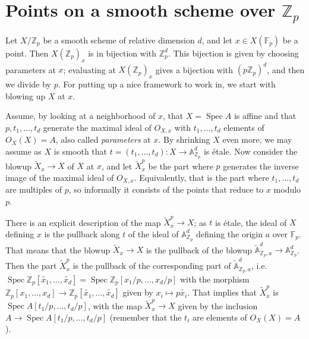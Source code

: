 \documentclass[12pt]{article}
\newcommand{\A}{\mathbb{A}}
\newcommand{\Z}{\mathbb{Z}}
\newcommand{\F}{\mathbb{F}}
\DeclareMathOperator{\Spec}{Spec}
\theoremstyle{plain}
\theoremstyle{definition}
\theoremstyle{remark}
\begin{document}
\newpage
\section{Points on a smooth scheme over \texorpdfstring{$\Z_p$}{Z\_p}}
\label{section:smoothzppoints}
Let $X/\Z_p$ be a smooth scheme of relative dimension $d$, and let $x \in X(\F_p)$ be a point. Then $X(\Z_p)_x$ is in bijection with $\Z_p^d$. This bijection is given by choosing parameters at $x$; evaluating at $X(\Z_p)_x$ gives a bijection with $(p\Z_p)^d$, and then we divide by $p$. For putting up a nice framework to work in, we start with blowing up $X$ at $x$.

Assume, by looking at a neighborhood of $x$, that $X = \Spec A$ is affine and that $p,t_1,\dots,t_d$ generate the maximal ideal of $O_{X,x}$ with $t_1,\dots,t_d$ elements of $O_X(X) = A$, also called \textit{parameters} at $x$. By shrinking $X$ even more, we may assume as $X$ is smooth that $t = (t_1,\dots,t_d): X \to \A^d_{\Z_p}$ is \'etale. Now consider the blowup $\widetilde{X}_x \to X$ of $X$ at $x$, and let $\widetilde{X}_x^p$ be the part where $p$ generates the inverse image of the maximal ideal of $O_{X,x}$. Equivalently, that is the part where $t_1,\dots,t_d$ are multiples of $p$, so informally it consists of the points that reduce to $x$ modulo $p$.

There is an explicit description of the map $\widetilde{X}_x^p \to X$; as $t$ is \'etale, the ideal of $X$ defining $x$ is the pullback along $t$ of the ideal of $\A^d_{\Z_p}$ defining the origin $a$ over $\F_p$. That means that the blowup $\widetilde{X}_x \to X$ is the pullback of the blowup $\widetilde{\A}^d_{\Z_p,a} \to \A_{\Z_p}^d$. Then the part $\widetilde{X}_x^p$ is the pullback of the corresponding part of $\widetilde{\A}^d_{\Z_p,a}$, i.e. $\Spec \Z_p[\widetilde{x_1},\dots,\widetilde{x_d}] = \Spec \Z_p[x_1/p,\dots,x_d/p]$ with the morphism $\Z_p[x_1,\dots,x_d] \to \Z_p[\widetilde{x_1},\dots,\widetilde{x_d}]$ given by $x_i \mapsto p\widetilde{x_i}$. That implies that $\widetilde{X}_x^p$ is $\Spec A[t_1/p,\dots,t_d/p]$, with the map $\widetilde{X}_x^p \to X$ given by the inclusion $A \to \Spec A[t_1/p,\dots,t_d/p]$ (remember that the $t_i$ are elements of $O_X(X) = A$).
\end{document}
